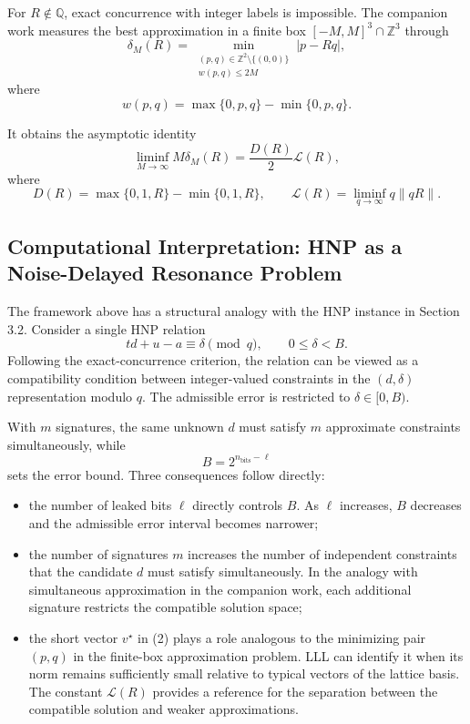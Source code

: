 \documentclass[11pt,a4paper]{article}
\begin{document}
For $R\notin\mathbb Q$, exact concurrence with integer labels is impossible. The companion work measures the best approximation in a finite box $[-M,M]^3\cap\mathbb Z^3$ through
\[
\delta_M(R)=
\min_{\substack{(p,q)\in\mathbb Z^2\setminus\{(0,0)\}\\
w(p,q)\leq 2M}}
|p-Rq|,
\]
where
\[
w(p,q)=\max\{0,p,q\}-\min\{0,p,q\}.
\]

It obtains the asymptotic identity
\[
\liminf_{M\to\infty}M\delta_M(R)
=
\frac{D(R)}{2}\mathcal L(R),
\]
where
\[
D(R)=\max\{0,1,R\}-\min\{0,1,R\},
\qquad
\mathcal L(R)=\liminf_{q\to\infty}q\|qR\|.
\]

\subsection{Computational Interpretation: HNP as a Noise-Delayed Resonance Problem}

The framework above has a structural analogy with the HNP instance in Section 3.2. Consider a single HNP relation
\[
td+u-a\equiv\delta\pmod q,
\qquad
0\leq\delta<B.
\]
Following the exact-concurrence criterion, the relation can be viewed as a compatibility condition between integer-valued constraints in the $(d,\delta)$ representation modulo $q$. The admissible error is restricted to $\delta\in[0,B)$.

With $m$ signatures, the same unknown $d$ must satisfy $m$ approximate constraints simultaneously, while
\[
B=2^{n_{\mathrm{bits}}-\ell}
\]
sets the error bound. Three consequences follow directly:
\begin{itemize}[leftmargin=2em]
\item the number of leaked bits $\ell$ directly controls $B$. As $\ell$ increases, $B$ decreases and the admissible error interval becomes narrower;
\item the number of signatures $m$ increases the number of independent constraints that the candidate $d$ must satisfy simultaneously. In the analogy with simultaneous approximation in the companion work, each additional signature restricts the compatible solution space;
\item the short vector $v^\star$ in (2) plays a role analogous to the minimizing pair $(p,q)$ in the finite-box approximation problem. LLL can identify it when its norm remains sufficiently small relative to typical vectors of the lattice basis. The constant $\mathcal L(R)$ provides a reference for the separation between the compatible solution and weaker approximations.
\end{itemize}
\end{document}
